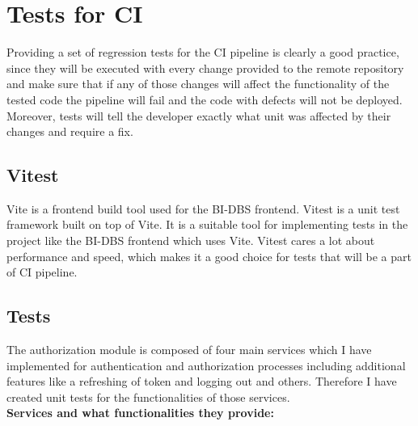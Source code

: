 \section{Tests for CI} Providing a set of regression tests for the CI pipeline is clearly a good practice, since they will be executed with every change provided to the remote repository and make sure that if any of those changes will affect the functionality of the tested code the pipeline will fail and the code with defects will not be deployed. Moreover, tests will tell the developer exactly what unit was affected by their changes and require a fix.


\subsection{Vitest} Vite is a frontend build tool used for the BI-DBS frontend. Vitest is a unit test framework built on top of Vite. It is a suitable tool for implementing tests in the project like the BI-DBS frontend which uses Vite. Vitest cares a lot about performance and speed, which makes it a good choice for tests that will be a part of CI pipeline.

\subsection{Tests} The authorization module is composed of four main services which I have implemented for authentication and authorization processes including additional features like a refreshing of token and logging out and others. Therefore I have created unit tests for the functionalities of those services.\\

\noindent \textbf{Services and what functionalities they provide:}

